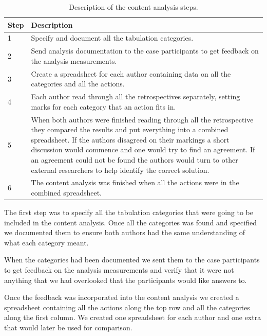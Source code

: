 \begin{table}
	\begin{centering}
		\caption{Description of the content analysis steps.}
		\label{table:content-analysis-steps}
		\begin{tabular}{l p{}}
			Step & Description \\ 
			\hline
			1 & Specify and document all the tabulation categories. \\
			2 & Send analysis documentation to the case participants to get feedback on the analysis measurements. \\
			3 & Create a spreadsheet for each author containing data on all the categories and all the actions. \\
			4 & Each author read through all the retrospectives separately, setting marks for each category that an action fits in. \\
			5 & When both authors were finished reading through all the retrospective they compared the results and put everything into a combined spreadsheet. If the authors disagreed on their markings a short discussion would commence and one would try to find an agreement. If an agreement could not be found the authors would turn to other external researchers to help identify the correct solution. \\
			6 & The content analysis was finished when all the actions were in the combined spreadsheet. \\
		\end{tabular}
	\end{centering}
\end{table}

The first step was to specify all the tabulation categories that were going to be included in the content analysis. Once all the categories was found and specified we documented them to ensure both authors had the same understanding of what each category meant. 

When the categories had been documented we sent them to the case participants to get feedback on the analysis measurements and verify that it were not anything that we had overlooked that the participants would like answers to. 

Once the feedback was incorporated into the content analysis we created a spreadsheet containing all the actions along the top row and all the categories along the first column.  We created one spreadsheet for each author and one extra that would later be used for comparison. 

